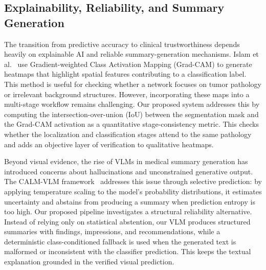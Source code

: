 \subsection{Explainability, Reliability, and Summary Generation}
The transition from predictive accuracy to clinical trustworthiness depends heavily on explainable AI and reliable summary-generation mechanisms. Islam et al.~\cite{Islam2026} use Gradient-weighted Class Activation Mapping (Grad-CAM) to generate heatmaps that highlight spatial features contributing to a classification label. This method is useful for checking whether a network focuses on tumor pathology or irrelevant background structures. However, incorporating these maps into a multi-stage workflow remains challenging. Our proposed system addresses this by computing the intersection-over-union (IoU) between the segmentation mask and the Grad-CAM activation as a quantitative stage-consistency metric. This checks whether the localization and classification stages attend to the same pathology and adds an objective layer of verification to qualitative heatmaps.

Beyond visual evidence, the rise of VLMs in medical summary generation has introduced concerns about hallucinations and unconstrained generative output. The CALM-VLM framework~\cite{Dhinagar2026} addresses this issue through selective prediction: by applying temperature scaling to the model's probability distributions, it estimates uncertainty and abstains from producing a summary when prediction entropy is too high. Our proposed pipeline investigates a structural reliability alternative. Instead of relying only on statistical abstention, our VLM produces structured summaries with findings, impressions, and recommendations, while a deterministic class-conditioned fallback is used when the generated text is malformed or inconsistent with the classifier prediction. This keeps the textual explanation grounded in the verified visual prediction.

 
 